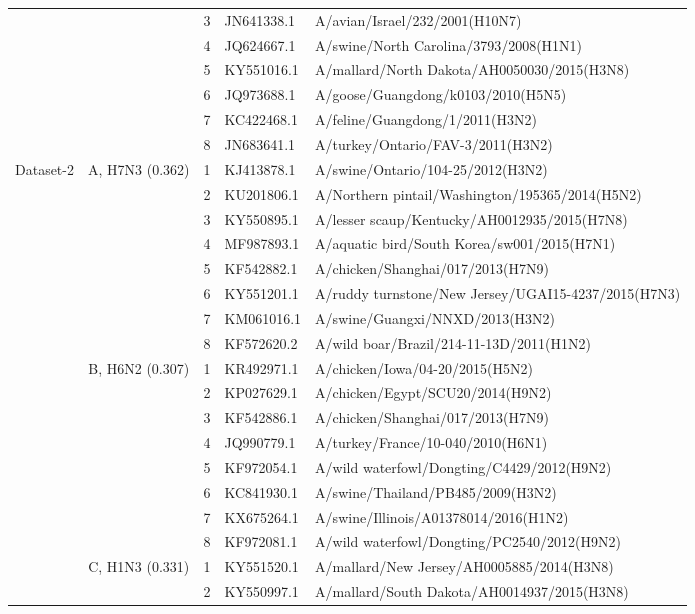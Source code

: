 \begin{table}[t]
\begin{tabular}{cclll}
 &  & 3 & JN641338.1 & A/avian/Israel/232/2001(H10N7) \\
 &  & 4 & JQ624667.1 & A/swine/North Carolina/3793/2008(H1N1) \\
 &  & 5 & KY551016.1 & A/mallard/North Dakota/AH0050030/2015(H3N8) \\
 &  & 6 & JQ973688.1 & A/goose/Guangdong/k0103/2010(H5N5) \\
 &  & 7 & KC422468.1 & A/feline/Guangdong/1/2011(H3N2) \\
 &  & 8 & JN683641.1 & A/turkey/Ontario/FAV-3/2011(H3N2) \\
\midrule
\multirow{24}{*}{Dataset-2} & \multirow{8}{*}{A, H7N3 (0.362)} & 1 & KJ413878.1 & A/swine/Ontario/104-25/2012(H3N2) \\
 &  & 2 & KU201806.1 & A/Northern pintail/Washington/195365/2014(H5N2) \\
 &  & 3 & KY550895.1 & A/lesser scaup/Kentucky/AH0012935/2015(H7N8) \\
 &  & 4 & MF987893.1 & A/aquatic bird/South Korea/sw001/2015(H7N1) \\
 &  & 5 & KF542882.1 & A/chicken/Shanghai/017/2013(H7N9) \\
 &  & 6 & KY551201.1 & A/ruddy turnstone/New Jersey/UGAI15-4237/2015(H7N3) \\
 &  & 7 & KM061016.1 & A/swine/Guangxi/NNXD/2013(H3N2) \\
 &  & 8 & KF572620.2 & A/wild boar/Brazil/214-11-13D/2011(H1N2) \\
\cmidrule(l){2-5}
 & \multirow{8}{*}{B, H6N2 (0.307)} & 1 & KR492971.1 & A/chicken/Iowa/04-20/2015(H5N2) \\
 &  & 2 & KP027629.1 & A/chicken/Egypt/SCU20/2014(H9N2) \\
 &  & 3 & KF542886.1 & A/chicken/Shanghai/017/2013(H7N9) \\
 &  & 4 & JQ990779.1 & A/turkey/France/10-040/2010(H6N1) \\
 &  & 5 & KF972054.1 & A/wild waterfowl/Dongting/C4429/2012(H9N2) \\
 &  & 6 & KC841930.1 & A/swine/Thailand/PB485/2009(H3N2) \\
 &  & 7 & KX675264.1 & A/swine/Illinois/A01378014/2016(H1N2) \\
 &  & 8 & KF972081.1 & A/wild waterfowl/Dongting/PC2540/2012(H9N2) \\
\cmidrule(l){2-5}
 & \multirow{8}{*}{C, H1N3 (0.331)} & 1 & KY551520.1 & A/mallard/New Jersey/AH0005885/2014(H3N8) \\
 &  & 2 & KY550997.1 & A/mallard/South Dakota/AH0014937/2015(H3N8) \\

\end{tabular}
\end{table}
